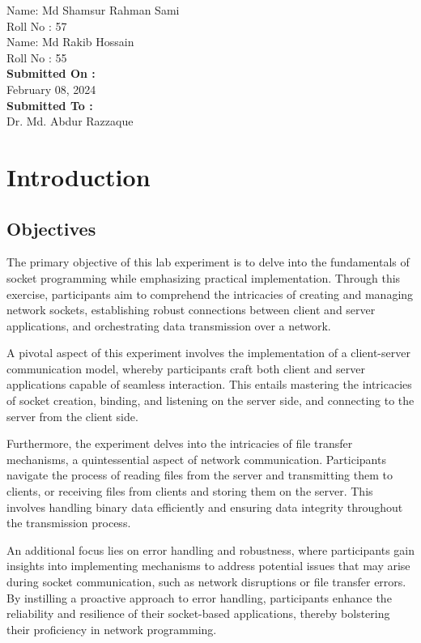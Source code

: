\documentclass[11pt]{article}
\begin{document}
\begin{titlepage}
\begin{large}
            Name: Md Shamsur Rahman Sami\\[5pt]
            Roll No : 57\\[7pt]
            Name: Md Rakib Hossain\\[5pt]
            Roll No : 55\\[12pt]
        \textbf{Submitted On : \\[12pt]}
            February 08, 2024\\[20pt]
        \textbf{Submitted To :\\[12pt]}
            Dr. Md. Abdur Razzaque\\[12pt]
    \end{large}
\end{titlepage}

\tableofcontents  

\newpage

\section{Introduction}
\subsection{Objectives}

The primary objective of this lab experiment is to delve into the fundamentals of socket programming while emphasizing practical implementation. Through this exercise, participants aim to comprehend the intricacies of creating and managing network sockets, establishing robust connections between client and server applications, and orchestrating data transmission over a network.

A pivotal aspect of this experiment involves the implementation of a client-server communication model, whereby participants craft both client and server applications capable of seamless interaction. This entails mastering the intricacies of socket creation, binding, and listening on the server side, and connecting to the server from the client side. 

Furthermore, the experiment delves into the intricacies of file transfer mechanisms, a quintessential aspect of network communication. Participants navigate the process of reading files from the server and transmitting them to clients, or receiving files from clients and storing them on the server. This involves handling binary data efficiently and ensuring data integrity throughout the transmission process.

An additional focus lies on error handling and robustness, where participants gain insights into implementing mechanisms to address potential issues that may arise during socket communication, such as network disruptions or file transfer errors. By instilling a proactive approach to error handling, participants enhance the reliability and resilience of their socket-based applications, thereby bolstering their proficiency in network programming.
\end{document}
